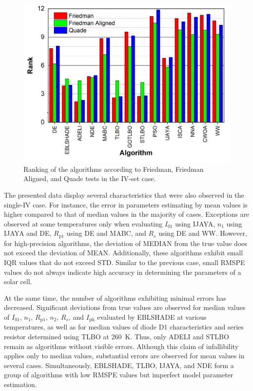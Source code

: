 \documentclass[a4paper,fleqn]{cas-sc}
\begin{document}
\begin{figure}[]
	\centering
		\includegraphics[width=0.5\columnwidth]{FigRankT}
	  \caption{Ranking of the algorithms according to Friedman, Friedman Aligned, and Quade tests in the IV-set case.}\label{figRankIVset}
\end{figure}

The presented data display several characteristics that were also observed in the single-IV case.
For instance, the error in parameters estimating by mean values is higher compared to that of median values in the majority of cases.
Exceptions are observed at some temperatures only when evaluating $I_{01}$ using IJAYA,
$n_1$ using IJAYA and DE,
$R_\mathrm{p1}$ using DE and MABC,
and $R_s$ using DE and WW.
However, for high-precision algorithms, the deviation of MEDIAN from the true value does not exceed the deviation of MEAN.
Additionally, these algorithms exhibit small IQR values that do not exceed STD.
Similar to the previous case, small RMSPE values do not always indicate high accuracy in determining the parameters of a solar cell.

At the same time, the number of algorithms exhibiting minimal errors has decreased.
Significant deviations from true values are observed for median values
of $I_{01}$, $n_{1}$, $R_\mathrm{p1}$, $n_2$, $R_s$, and $I_\mathrm{ph}$ evaluated by EBLSHADE at various temperatures,
as well as for median values of diode D1 characteristics and series resistor determined using TLBO at 260~K.
Thus, only ADELI and STLBO remain as algorithms without visible errors.
Although this claim of infallibility applies only to median values,
substantial errors are observed for mean values in several cases.
Simultaneously, EBLSHADE, TLBO, IJAYA, and NDE form a group of algorithms with low RMSPE values but imperfect model parameter estimation.
\end{document}
